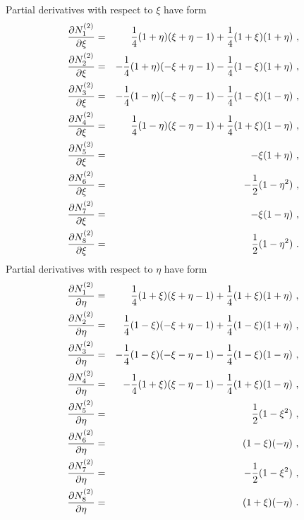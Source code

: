 Partial derivatives with respect to $\xi$ have form
\begin{eqnarray}
\label{bfquadquaddx1}
\ppd{N_1^{(2)}}{\xi} &=& \del{1}{4} (1 + \eta) (\xi + \eta - 1) +
\del{1}{4} (1 + \xi) (1 + \eta)\ ,
\\
\label{bfquadquaddx2}
\ppd{N_2^{(2)}}{\xi} &=& - \del{1}{4} (1 + \eta) (- \xi + \eta - 1) -
\del{1}{4} (1 - \xi) (1 + \eta)\ ,
\\
\label{bfquadquaddx3}
\ppd{N_3^{(2)}}{\xi} &=& - \del{1}{4} (1 - \eta) (- \xi - \eta - 1) -
\del{1}{4} (1 - \xi) (1 - \eta)\ ,
\\
\label{bfquadquaddx4}
\ppd{N_4^{(2)}}{\xi} &=& \del{1}{4} (1 - \eta) (\xi - \eta - 1) +
\del{1}{4} (1 + \xi) (1 - \eta)\ ,
\\
\label{bfquadquaddx5}
\ppd{N_5^{(2)}}{\xi} &=& - \xi (1 + \eta)\ ,
\\
\label{bfquadquaddx6}
\ppd{N_6^{(2)}}{\xi} &=& - \del{1}{2} (1 - \eta^2)\ ,
\\
\label{bfquadquaddx7}
\ppd{N_7^{(2)}}{\xi} &=& - \xi (1 - \eta)\ ,
\\
\label{bfquadquaddx8}
\ppd{N_8^{(2)}}{\xi} &=& \del{1}{2} (1 - \eta^2)\ .
\end{eqnarray}
Partial derivatives with respect to $\eta$ have form
\begin{eqnarray}
\label{bfquadquaddy1}
\ppd{N_1^{(2)}}{\eta} &=& \del{1}{4} (1 + \xi) (\xi + \eta - 1) +
\del{1}{4} (1 + \xi) (1 + \eta)\ ,
\\
\label{bfquadquaddy2}
\ppd{N_2^{(2)}}{\eta} &=& \del{1}{4} (1 - \xi) (- \xi + \eta - 1) +
\del{1}{4} (1 - \xi) (1 + \eta)\ ,
\\
\label{bfquadquaddy3}
\ppd{N_3^{(2)}}{\eta} &=& - \del{1}{4} (1 - \xi) (- \xi - \eta - 1) -
\del{1}{4} (1 - \xi) (1 - \eta)\ ,
\\
\label{bfquadquaddy4}
\ppd{N_4^{(2)}}{\eta} &=& - \del{1}{4} (1 + \xi) (\xi - \eta - 1) -
\del{1}{4} (1 + \xi) (1 - \eta)\ ,
\\
\label{bfquadquaddy5}
\ppd{N_5^{(2)}}{\eta} &=& \del{1}{2} (1 - \xi^2)\ ,
\\
\label{bfquadquaddy6}
\ppd{N_6^{(2)}}{\eta} &=& (1 - \xi) (- \eta)\ ,
\\
\label{bfquadquaddy7}
\ppd{N_7^{(2)}}{\eta} &=& - \del{1}{2} (1 - \xi^2)\ ,
\\
\label{bfquadquaddy8}
\ppd{N_8^{(2)}}{\eta} &=& (1 + \xi) (- \eta)\ .
\end{eqnarray}

